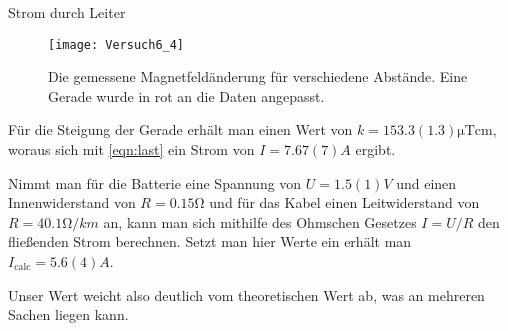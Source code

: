 \documentclass{alex_gp}
\begin{document}
\begin{mybox}{Strom durch Leiter}
	\begin{figure}[H]	
		\centering
		\texttt{[image: Versuch6\_4]}
		\caption{Die gemessene Magnetfeldänderung für verschiedene Abstände. Eine Gerade wurde in rot an die Daten angepasst.}
		\label{fig:BFit}
	\end{figure}

	Für die Steigung der Gerade erhält man einen Wert von \( k = 153.3(1.3) \unit{\micro\tesla\cm} \), woraus sich mit \autoref{eqn:last} ein Strom von \( I = 7.67(7) \unit{A} \) ergibt.
	
	Nimmt man für die Batterie eine Spannung von \( U = 1.5(1) \unit{V} \) und einen Innenwiderstand von \( R = 0.15 \unit{\ohm} \) und für das Kabel einen Leitwiderstand von \( R = 40.1 \unit{\ohm/km} \) an, kann man sich mithilfe des Ohmschen Gesetzes \( I = U/R \) den fließenden Strom berechnen. Setzt man hier Werte ein erhält man \( I_{\text{calc}} = 5.6(4) \unit{A} \).
	
	Unser Wert weicht also deutlich vom theoretischen Wert ab, was an mehreren Sachen liegen kann.
\end{mybox}
\end{document}
